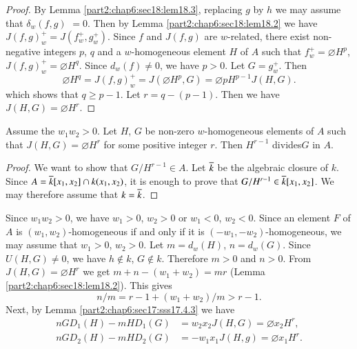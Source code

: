 \begin{proof}
  By Lemma \ref{part2:chap6:sec18:lem18.3}, replacing $g$ by $h$ we
  may assume that $\delta_w (f, g)$ $=0$. Then by
  Lemma \ref{part2:chap6:sec18:lem18.2} we have $J(f, g)_w^+ = J(f_w^+
  , g_w^+)$. Since $f$ and $J(f, g)$ are $w$-related, there exist
  non-negative integers $p$, $q$ and a $w$-homogeneous element $H$ of
  $A$ such that $f_w^+ = \diameter H^p$, $J(f, g)_w^+= \diameter
  H^q$. Since $d_w (f) \neq 0$, we have $p > 0$.  Let $G= g_w^+$. Then
$$
\diameter H^q = J(f, g)_w^+
= J(\diameter H^p, G)= \diameter p H^{p-1} J(H, G).
$$
which shows that $q\geq p-1$. Let $r=q-(p-1)$. Then we have $J(H, G)=
\diameter H^r$.
\end{proof}

\begin{lemma}\label{part2:chap6:sec18:lem18.5}
  Assume the $w_1 w_2 > 0$. Let $H$, $G$ be non-zero $w$-homogeneous
  elements of $A$ such that $J(H, G)= \diameter H^r$ for some positive
  integer $r$. Then $H^{r-1}$ divides\pageoriginale $G$ in $A$.
\end{lemma}

\begin{proof}
We want to show that $G/H^{r-1}\in A$. Let $\overline{k}$ be the algebraic
closure of $k$. Since $A= \overline{k} [x_1, x_2]\cap k(x_1, x_2)$, it is
enough to prove that $G/H^{r-1} \in \overline{k} [x_1, x_2]$. We may
therefore assume that $k = \overline{k}$.
\end{proof}

Since $w_1 w_2 > 0$, we have $w_1 > 0$, $w_2> 0$ or $w_1< 0$, $w_2<
0$. Since an element $F$ of $A$ is $(w_1, w_2)$-homogeneous if and
only if it is $(-w_1, - w_2)$-homogeneous, we may assume that $w_1>0$,
$w_2> 0$. Let $m= d_w (H)$, $n= d_w (G)$. Since $U(H, G) \neq 0$, we
have $h \notin k$, $G \notin k$. Therefore $m > 0$ and $n > 0$. From
$J(H, G)= \diameter H^r$ we get $m+n - (w_1+ w_2)= mr$
(Lemma \ref{part2:chap6:sec18:lem18.2}). This gives
\begin{equation*}
  n/m = r-1 + (w_1+
  w_2)/m>r-1. \tag{18.5.1}\label{part2:chap6:sec18:eq18.5.1} 
\end{equation*}
Next, by Lemma \ref{part2:chap6:sec17:sss17.4.3} we have
\begin{equation*}
\begin{aligned}
  nGD_1 (H) - m H D_1 (G) & = w_2 x_2 J(H, G)= \diameter x_2 H^r,\\
  nGD_2 (H) - mHD_2 (G) & = - w_1 x_1 J(H, g)= \diameter x_1 H^r.
\end{aligned}\tag{18.5.2}\label{part2:chap6:sec18:eq18.5.2} 
\end{equation*}

